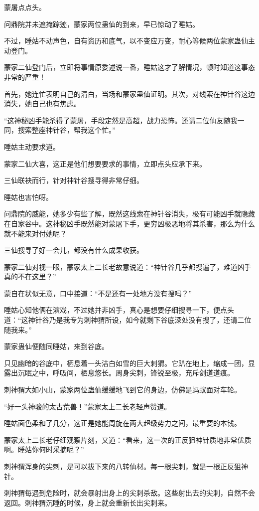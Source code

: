 \begin{this_body}
蒙屠点点头。

问鼎院并未遮掩踪迹，蒙家两位蛊仙的到来，早已惊动了睡姑。

不过，睡姑不动声色，自有资历和底气，以不变应万变，耐心等候两位蒙家蛊仙主动登门。

蒙家二仙登门后，立即将事情原委述说一番，睡姑这才了解情况，顿时知道这事态非常的严重！

首先，她连忙表明自己的清白，当场和蒙家蛊仙证明。其次，对线索在神针谷这边消失，她自己也有焦虑。

“这神秘凶手能杀得了蒙屠，手段定然是高超，战力恐怖。还请二位仙友随我一同，搜索整座神针谷，帮我这个忙。”

睡姑主动要求道。

蒙家二仙大喜，这正是他们想要要求的事情，立即点头应承下来。

三仙联袂而行，针对神针谷搜寻得非常仔细。

睡姑也害怕呀。

问鼎院的威能，她多少有些了解，既然这线索在神针谷消失，极有可能凶手就隐藏在自家谷中。这神秘凶手既然能对蒙屠下手，更穷凶极恶地将其杀害，那么为什么就不能来对付她呢？

三仙搜寻了好一会儿，都没有什么成果收获。

蒙家二仙对视一眼，蒙家太上二长老故意说道：“神针谷几乎都搜遍了，难道凶手真的不在这里？”

蒙自在状似无意，口中接道：“不是还有一处地方没有搜吗？”

睡姑心知他俩在演戏，不过她并非凶手，真心是想要仔细搜寻一下，便点头道：“这神针谷乃是我专为刺神猬所设，如今就剩下谷底深处没有搜了，还请二位随我来。”

蒙家蛊仙便随同睡姑，来到谷底。

只见幽暗的谷底中，栖息着一头洁白如雪的巨大刺猬。它趴在地上，缩成一团，显露出沉眠之中，呼吸间，栖息悠长。周身尖刺，锋锐至极，充斥剑道道痕。

刺神猬大如小山，蒙家两位蛊仙缓缓地飞到它的身边，仿佛是蚂蚁面对车轮。

“好一头神骏的太古荒兽！”蒙家太上二长老轻声赞道。

睡姑面色柔和了几分，这正是她能周旋在两大超级势力之间，最重要的本钱。

蒙家太上二长老仔细观察片刻，又道：“看来，这一次的正反狙神针质地非常优质啊。睡姑你何时采摘呢？”

刺神猬浑身的尖刺，是可以拔下来的八转仙材。每一根尖刺，就是一根正反狙神针。

刺神猬每遇到危险时，就会暴射出身上的尖刺杀敌。这些射出去的尖刺，自然不会返回。刺神猬沉睡的时候，身上就会重新长出尖刺来。


\end{this_body}
